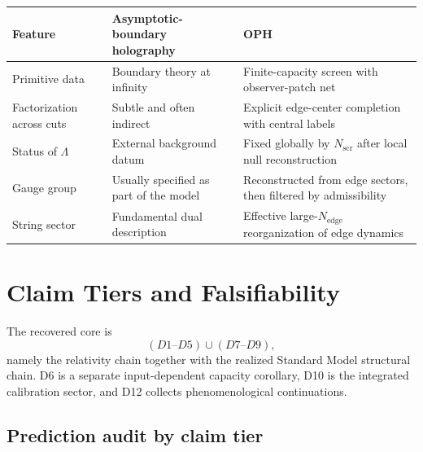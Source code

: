 \documentclass[11pt]{article}
\begin{document}
\begingroup
\footnotesize
\begin{tabular}{@{}>{\raggedright\arraybackslash}p{}>{\raggedright\arraybackslash}p{}>{\raggedright\arraybackslash}p{}@{}}
\toprule
Feature & Asymptotic-boundary holography & OPH \\
\midrule
Primitive data & Boundary theory at infinity & Finite-capacity screen with observer-patch net \\
Factorization across cuts & Subtle and often indirect & Explicit edge-center completion with central labels \\
Status of $\Lambda$ & External background datum & Fixed globally by $N_{\mathrm{scr}}$ after local null reconstruction \\
Gauge group & Usually specified as part of the model & Reconstructed from edge sectors, then filtered by admissibility \\
String sector & Fundamental dual description & Effective large-$N_{\mathrm{edge}}$ reorganization of edge dynamics \\
\bottomrule
\end{tabular}
\endgroup

\section{Claim Tiers and Falsifiability}

The recovered core is
\[
(D1\text{--}D5)\cup(D7\text{--}D9),
\]
namely the relativity chain together with the realized Standard Model structural chain. D6 is a separate input-dependent capacity corollary, D10 is the integrated calibration sector, and D12 collects phenomenological continuations.

\subsection{Prediction audit by claim tier}
\end{document}
